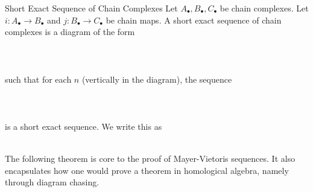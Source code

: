 \documentclass[a4paper]{article}
\begin{document}
\begin{defn}{Short Exact Sequence of Chain Complexes}{} Let $A_\bullet,B_\bullet,C_\bullet$ be chain complexes. Let $i:A_\bullet\to B_\bullet$ and $j:B_\bullet\to C_\bullet$ be chain maps. A short exact sequence of chain complexes is a diagram of the form \\~\\
\\~\\
such that for each $n$ (vertically in the diagram), the sequence \\~\\
\\~\\ is a short exact sequence. We write this as \\~\\
\end{defn}

The following theorem is core to the proof of Mayer-Vietoris sequences. It also encapsulates how one would prove a theorem in homological algebra, namely through diagram chasing. 
\end{document}
